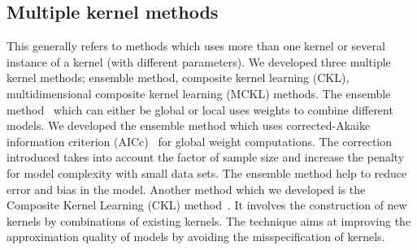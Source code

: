 \documentclass[11pt, letterpaper]{article}
\begin{document}
\subsection{Multiple kernel methods}
This generally refers to methods which uses more than one kernel or several instance of a kernel (with different parameters). We developed three multiple kernel methods; ensemble method, composite kernel learning (CKL), multidimensional composite kernel learning (MCKL) methods. The ensemble method~\cite{Palar2018,Palar2019a} which can either be global or local uses weights to combine different models.  We developed the ensemble method which uses corrected-Akaike information criterion (AICc)~\cite{Martin2005a} for global weight computations. The correction introduced takes into account the factor of sample size and increase the penalty for model complexity with small data sets. The ensemble method help to reduce error  and  bias in  the  model. Another method which we developed is the Composite Kernel Learning (CKL) method~\cite{Palar2019}. It involves the construction of new kernels by combinations of existing kernels. The technique aims at improving the approximation quality of models by avoiding the misspecification of kernels.
\end{document}
